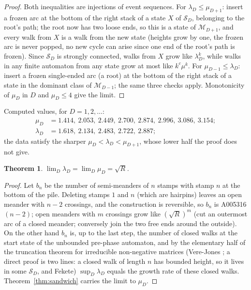 \documentclass[11pt]{amsart}
\newtheorem{theorem}{Theorem}[section]
\theoremstyle{definition}
\newcommand{\Mm}{\mathcal M}
\newcommand{\Ss}{\mathcal S}
\begin{document}
\begin{proof}
Both inequalities are injections of event sequences. For $\lambda_D\le\mu_{D+1}$: insert a frozen arc at the bottom of the right stack of a state $X$ of $\Ss_D$, belonging to the root's path; the root now has two loose ends, so this is a state of $\Mm_{D+1}$, and every walk from $X$ is a walk from the new state (heights grow by one, the frozen arc is never popped, no new cycle can arise since one end of the root's path is frozen). Since $\Ss_D$ is strongly connected, walks from $X$ grow like $\lambda_D^k$, while walks in any finite automaton from any state grow at most like $k^c\mu^k$. For $\mu_{D-1}\le\lambda_D$: insert a frozen single-ended arc (a root) at the bottom of the right stack of a state in the dominant class of $\Mm_{D-1}$; the same three checks apply. Monotonicity of $\mu_D$ in $D$ and $\mu_D\le4$ give the limit.
\end{proof}

Computed values, for $D=1,2,\dots$:
\begin{align*}\mu_D&=1.414,\ 2.053,\ 2.449,\ 2.700,\ 2.874,\ 2.996,\ 3.086,\ 3.154;\\ \lambda_D&=1.618,\ 2.134,\ 2.483,\ 2.722,\ 2.887;\end{align*} the data satisfy the sharper $\mu_D<\lambda_D<\mu_{D+1}$, whose lower half the proof does not give.

\begin{theorem}\label{thm:limit}
$\lim_D\lambda_D=\lim_D\mu_D=\sqrt R$.
\end{theorem}

\begin{proof}
Let $b_n$ be the number of semi-meanders of $n$ stamps with stamp $n$ at the bottom of the pile. Deleting stamps $1$ and $n$ (which are hairpins) leaves an open meander with $n-2$ crossings, and the construction is reversible, so $b_n$ is A005316$(n-2)$; open meanders with $m$ crossings grow like $(\sqrt R)^m$ (cut an outermost arc of a closed meander; conversely join the two free ends around the outside). On the other hand $b_n$ is, up to the last step, the number of closed walks at the start state of the unbounded pre-phase automaton, and by the elementary half of the truncation theorem for irreducible non-negative matrices (Vere-Jones \cite{VereJones}; a direct proof is two lines: a closed walk of length $n$ has bounded height, so it lives in some $\Ss_D$, and Fekete) $\sup_D\lambda_D$ equals the growth rate of these closed walks. Theorem~\ref{thm:sandwich} carries the limit to $\mu_D$.
\end{proof}
\end{document}
